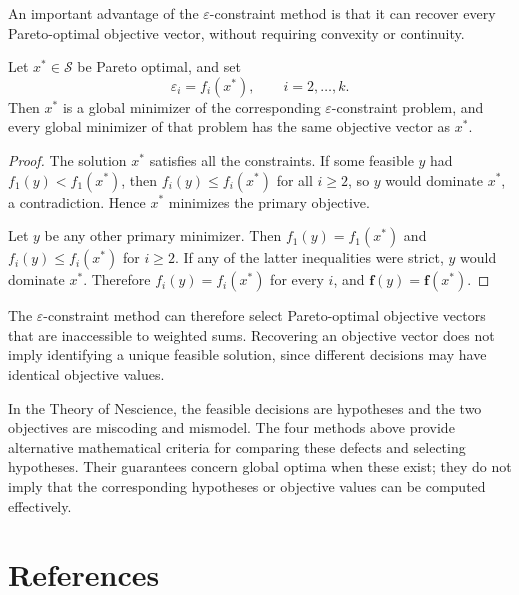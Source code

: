 An important advantage of the $\varepsilon$-constraint method is that it can recover every Pareto-optimal objective vector, without requiring convexity or continuity.

\begin{proposition}
\label{prop:epsilon_constraint_recovery}
Let $x^*\in\mathcal{S}$ be Pareto optimal, and set
\[
\varepsilon_i=f_i(x^*),\qquad i=2,\ldots,k.
\]
Then $x^*$ is a global minimizer of the corresponding $\varepsilon$-constraint problem, and every global minimizer of that problem has the same objective vector as $x^*$.
\end{proposition}
\begin{proof}
The solution $x^*$ satisfies all the constraints. If some feasible $y$ had $f_1(y)<f_1(x^*)$, then $f_i(y)\leq f_i(x^*)$ for all $i\geq2$, so $y$ would dominate $x^*$, a contradiction. Hence $x^*$ minimizes the primary objective.

Let $y$ be any other primary minimizer. Then $f_1(y)=f_1(x^*)$ and $f_i(y)\leq f_i(x^*)$ for $i\geq2$. If any of the latter inequalities were strict, $y$ would dominate $x^*$. Therefore $f_i(y)=f_i(x^*)$ for every $i$, and $\mathbf{f}(y)=\mathbf{f}(x^*)$.
\end{proof}

The $\varepsilon$-constraint method can therefore select Pareto-optimal objective vectors that are inaccessible to weighted sums. Recovering an objective vector does not imply identifying a unique feasible solution, since different decisions may have identical objective values.

In the Theory of Nescience, the feasible decisions are hypotheses and the two objectives are miscoding and mismodel. The four methods above provide alternative mathematical criteria for comparing these defects and selecting hypotheses. Their guarantees concern global optima when these exist; they do not imply that the corresponding hypotheses or objective values can be computed effectively.

%
%

\section*{References}


